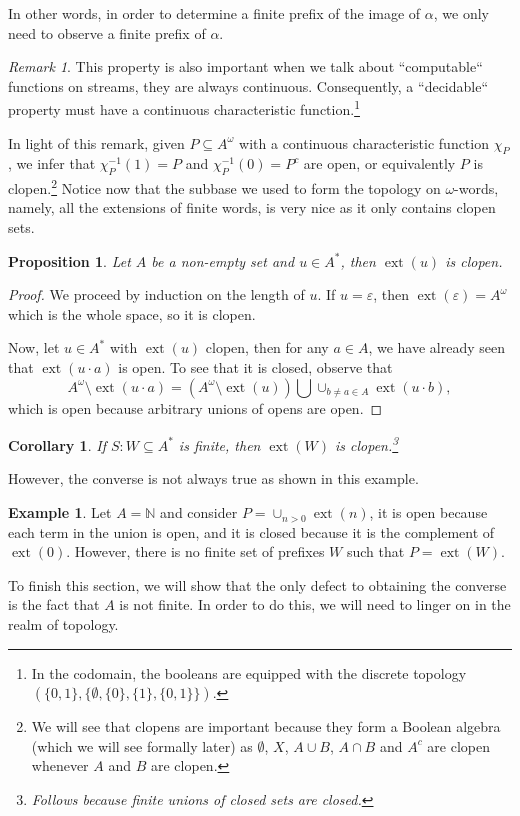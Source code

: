 \documentclass{tufte-handout} %
\newtheorem{cor}[thm]{Corollary}
\newtheorem{prop}[thm]{Proposition}
\theoremstyle{definition}
\newtheorem{exmp}[thm]{Example}
\theoremstyle{remark}
\newtheorem{rem}[thm]{Remark}
\newcommand{\bra}[1]{\left(#1\right)}
\newcommand{\N}{\mathbb{N}}
\newcommand{\0}{\textsf{0}}
\newcommand{\1}{\textsf{1}}
\DeclareMathOperator{\ext}{ext}
\begin{document}
In other words, in order to determine a finite prefix of the image of $\alpha$, we only need to observe a finite prefix of $\alpha$.
\begin{rem}
	This property is also important when we talk about ``computable`` functions on streams, they are always continuous. Consequently, a ``decidable`` property must have a continuous characteristic function.\footnote{In the codomain, the booleans are equipped with the discrete topology $(\{0,1\}, \{\emptyset, \{0\}, \{1\}, \{0,1\}\})$.} %
\end{rem}
In light of this remark, given $P \subseteq A^{\omega}$ with a continuous characteristic function $\chi_P$, we infer that $\chi_P^{-1}(1) = P$ and $\chi_P^{-1}(0) = P^c$ are open, or equivalently $P$ is clopen.\footnote{We will see that clopens are important because they form a Boolean algebra (which we will see formally later) as $\emptyset$, $X$, $A \cup B$, $A\cap B$ and $A^c$ are clopen whenever $A$ and $B$ are clopen.}
Notice now that the subbase we used to form the topology on $\omega$-words, namely, all the extensions of finite words, is very nice as it only contains clopen sets.
\begin{prop}
	Let $A$ be a non-empty set and $u \in A^*$, then $\ext(u)$ is clopen.
\end{prop}
\begin{proof}
	We proceed by induction on the length of $u$. If $u = \varepsilon$, then $\ext(\varepsilon) = A^{\omega}$ which is the whole space, so it is clopen.
	
	Now, let $u \in A^*$ with $\ext(u)$ clopen, then for any $a \in A$, we have already seen that $\ext(u\cdot a)$ is open. To see that it is closed,  observe that \[A^{\omega} \setminus \ext(u \cdot a) = \bra{A^{\omega} \setminus \ext(u)} \bigcup \cup_{b \neq a\in A}\ext(u\cdot b),\] which is open because arbitrary unions of opens are open.
\end{proof}
\begin{cor}\label{cor-finiteextclopen}
	If $S: W \subseteq A^*$ is finite, then $\ext(W)$ is clopen.\footnote{Follows because finite unions of closed sets are closed.}
\end{cor}
However, the converse is not always true as shown in this example.
\begin{exmp}
	Let $A = \N$ and consider $P =\cup_{n > 0} \ext(n)$, it is open because each term in the union is open, and it is closed because it is the complement of $\ext(0)$. However, there is no finite set of prefixes $W$ such that $P = \ext(W)$. 
\end{exmp}
To finish this section, we will show that the only defect to obtaining the converse is the fact that $A$ is not finite. In order to do this, we will need to linger on in the realm of topology.
\end{document}
